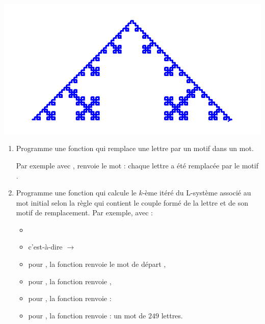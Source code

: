 \documentclass[11pt,class=report,crop=false]{standalone}
\begin{document}
\begin{activite}



\begin{center}
\includegraphics[scale=0.4]{ecran-lsysteme-2}
\end{center}

\begin{enumerate}
  \item Programme une fonction  qui remplace une lettre par un motif dans un mot. 

Par exemple avec ,  renvoie le mot  : chaque lettre  a été remplacée par le motif .
 
  \item Programme une fonction 
  qui calcule le $k$-ème itéré du L-système associé au mot initial  selon la règle  qui contient le couple formé de la lettre et de son motif de remplacement.
  Par exemple, avec :
  \begin{itemize}
    \item {}
    \item {} c'est-à-dire  $\rightarrow$ 
    \item pour , la fonction renvoie le mot de départ ,
    \item pour , la fonction renvoie ,
    \item pour , la fonction renvoie :\\ \centerline{}
    \item pour , la fonction renvoie :  un mot de $249$ lettres.
    

\end{itemize}
\end{enumerate}
\end{activite}
\end{document}

